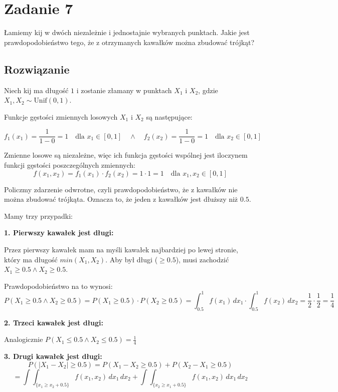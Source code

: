 \section{Zadanie 7}
Łamiemy kij w dwóch niezależnie i jednostajnie wybranych punktach. Jakie
jest prawdopodobieństwo tego, że z otrzymanych kawałków można zbudować trójkąt?


\subsection*{Rozwiązanie}
Niech kij ma długość \(1\) i zostanie złamany w punktach \(X_1\) i \(X_2\), gdzie \(X_1, X_2 \sim \text{Unif}(0, 1)\).

Funkcje gęstości zmiennych losowych \(X_1\) i \(X_2\) są następujące:

\[
	f_1(x_1) = \frac{1}{1 - 0} = 1 \quad \text{dla } x_1 \in [0, 1] \quad \land \quad f_2(x_2) = \frac{1}{1 - 0} = 1 \quad \text{dla } x_2 \in [0, 1]
\]

Zmienne losowe są niezależne, więc ich funkcja gęstości wspólnej jest iloczynem funkcji gęstości poszczególnych zmiennych:
\[
	f(x_1, x_2) = f_1(x_1) \cdot f_2(x_2) = 1 \cdot 1 = 1 \quad \text{dla } x_1, x_2 \in [0, 1]
\]

Policzmy zdarzenie odwrotne, czyli prawdopodobieństwo, że z kawałków nie można zbudować trójkąta.
Oznacza to, że jeden z kawałków jest dłuższy niż \(0.5\).

Mamy trzy przypadki:

\medbreak
\textbf{1. Pierwszy kawałek jest długi:}

Przez pierwszy kawałek mam na myśli kawałek najbardziej po lewej stronie, który ma długość \(min(X_1, X_2)\).
Aby był długi (\(\geq 0.5\)), musi zachodzić \(X_1 \geq 0.5 \land X_2 \geq 0.5\).

Prawdopodobieństwo na to wynosi:
\[
	P(X_1 \geq 0.5 \land X_2 \geq 0.5) = P(X_1 \geq 0.5) \cdot P(X_2 \geq 0.5)
	= \int_{0.5}^{1} f(x_1) \, dx_1 \cdot \int_{0.5}^{1} f(x_2) \, dx_2 = \frac{1}{2} \cdot \frac{1}{2} = \frac{1}{4}
\]

\medbreak
\textbf{2. Trzeci kawałek jest długi:}

Analogicznie \(P(X_1 \leq 0.5 \land X_2 \leq 0.5) = \frac{1}{4}\)

\medbreak
\textbf{3. Drugi kawałek jest długi:}
\[
	P(|X_1 - X_2| \geq 0.5) = P(X_1 - X_2 \geq 0.5) + P(X_2 - X_1 \geq 0.5)
\]
\[
	= \int \int_{\{x_1 \geq x_2 + 0.5\}} f(x_1, x_2) \, dx_1 \, dx_2 + \int \int_{\{x_2 \geq x_1 + 0.5\}} f(x_1, x_2) \, dx_1 \, dx_2
\]

